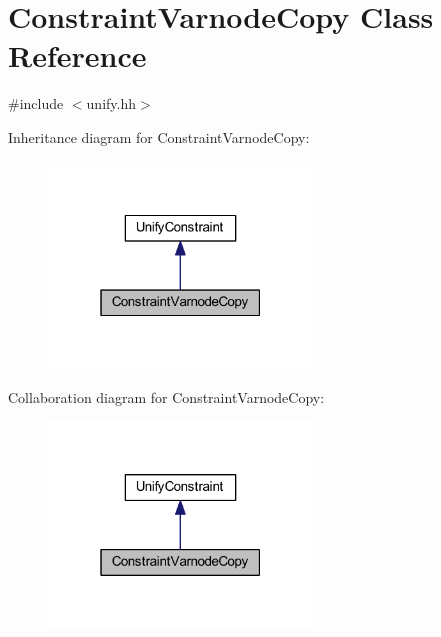 \hypertarget{class_constraint_varnode_copy}{}\section{Constraint\+Varnode\+Copy Class Reference}
\label{class_constraint_varnode_copy}


{\ttfamily \#include $<$unify.\+hh$>$}



Inheritance diagram for Constraint\+Varnode\+Copy\+:
\nopagebreak
\begin{figure}[H]
\begin{center}
\leavevmode
\includegraphics[width=199pt]{class_constraint_varnode_copy__inherit__graph}
\end{center}
\end{figure}


Collaboration diagram for Constraint\+Varnode\+Copy\+:
\nopagebreak
\begin{figure}[H]
\begin{center}
\leavevmode
\includegraphics[width=199pt]{class_constraint_varnode_copy__coll__graph}
\end{center}
\end{figure}
